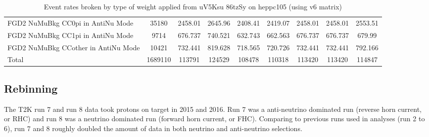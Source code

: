 \begin{sidewaystable}
{\begin{tabular}{| l | c | c | c | c | c | c | c | c |}
      FGD2 NuMuBkg CC0pi in AntiNu Mode & 35180 & 2458.01 & 2645.96 & 2408.41 & 2419.07 & 2458.01 & 2458.01 & 2553.51 \\
      FGD2 NuMuBkg CC1pi in AntiNu Mode & 9714 & 676.737 & 740.521 & 632.743 & 662.563 & 676.737 & 676.737 & 679.99 \\
      FGD2 NuMuBkg CCother in AntiNu Mode & 10421 & 732.441 & 819.628 & 718.565 & 720.726 & 732.441 & 732.441 & 792.166 \\
      \hline
      Total & 1689110 & 113791 & 124529 & 108478 & 110318 & 113420 & 113420 & 114847 \\
      \hline
      \hline
    \end{tabular}
        }
        \caption{Event rates broken by type of weight applied from uV5Ksu 86tzSy on heppc105 (using v6 matrix)}
  \label{tab:detailed_eventrate_2018}
\end{sidewaystable}

\subsection{Rebinning}
The T2K run 7 and run 8 data took  protons on target in 2015 and 2016. Run 7 was a anti-neutrino dominated run (reverse horn current, or RHC) and run 8 was a neutrino dominated run (forward horn current, or FHC). Comparing to previous runs used in analyses (run 2 to 6), run 7 and 8 roughly doubled the amount of data in both neutrino and anti-neutrino selections. 

